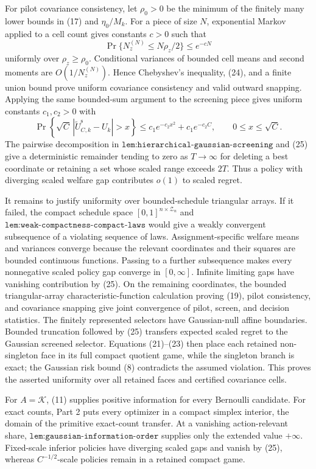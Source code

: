 For pilot covariance consistency, let \(\rho_0>0\) be the minimum of the finitely many lower bounds in (17) and \(\eta_0/M_k\).  For a piece of size \(N\), exponential Markov applied to a cell count gives constants \(c>0\) such that
\[
\Pr\{N_z^{(N)}\leq N\rho_z/2\}\leq e^{-cN}                       \tag{24}
\]
uniformly over \(\rho_z\geq\rho_0\).  Conditional variances of bounded cell means and second moments are \(O(1/N_z^{(N)})\).  Hence Chebyshev's inequality, (24), and a finite union bound prove uniform covariance consistency and valid outward snapping.  Applying the same bounded-sum argument to the screening piece gives uniform constants \(c_1,c_2>0\) with
\[
\Pr\!\left\{\sqrt C\,|\widetilde U_{C,k}^{\mathrm s}-U_k|>x\right\}
\leq c_1e^{-c_2x^2}+c_1e^{-c_2C},
\qquad 0\leq x\leq\sqrt C.                                      \tag{25}
\]
The pairwise decomposition in \(\texttt{lem:hierarchical-gaussian-screening}\) and (25) give a deterministic remainder tending to zero as \(T\to\infty\) for deleting a best coordinate or retaining a set whose scaled range exceeds \(2T\).  Thus a policy with diverging scaled welfare gap contributes \(o(1)\) to scaled regret.

It remains to justify uniformity over bounded-schedule triangular arrays.  If it failed, the compact schedule space \([0,1]^{n\times\mathcal Z_n}\) and \(\texttt{lem:weak-compactness-compact-laws}\) would give a weakly convergent subsequence of a violating sequence of laws.  Assignment-specific welfare means and variances converge because the relevant coordinates and their squares are bounded continuous functions.  Passing to a further subsequence makes every nonnegative scaled policy gap converge in \([0,\infty]\).  Infinite limiting gaps have vanishing contribution by (25).  On the remaining coordinates, the bounded triangular-array characteristic-function calculation proving (19), pilot consistency, and covariance snapping give joint convergence of pilot, screen, and decision statistics.  The finitely represented selectors have Gaussian-null affine boundaries.  Bounded truncation followed by (25) transfers expected scaled regret to the Gaussian screened selector.  Equations (21)--(23) then place each retained non-singleton face in its full compact quotient game, while the singleton branch is exact; the Gaussian risk bound (8) contradicts the assumed violation.  This proves the asserted uniformity over all retained faces and certified covariance cells.

For \(A=\mathcal K\), (11) supplies positive information for every Bernoulli candidate.  For exact counts, Part 2 puts every optimizer in a compact simplex interior, the domain of the primitive exact-count transfer.  At a vanishing action-relevant share, \(\texttt{lem:gaussian-information-order}\) supplies only the extended value \(+\infty\).  Fixed-scale inferior policies have diverging scaled gaps and vanish by (25), whereas \(C^{-1/2}\)-scale policies remain in a retained compact game.

